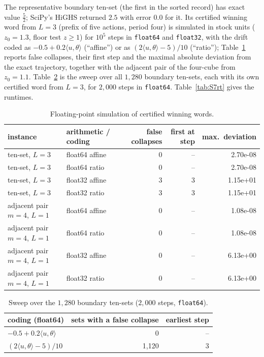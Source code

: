 \documentclass[11pt,a4paper]{article}
\theoremstyle{plain}
\theoremstyle{definition}
\theoremstyle{remark}
\newcommand{\tfr}[2]{\tfrac{#1}{#2}}
\begin{document}
The representative boundary ten-set (the first in the sorted record) has exact value $\tfr52$; SciPy's HiGHS returned $2.5$ with error $0.0$ for it. Its certified winning word from $L=3$ (prefix of five actions, period four) is simulated in stock units ($z_0=1.3$, floor test $z\ge1$) for $10^5$ steps in \texttt{float64} and \texttt{float32}, with the drift coded as $-0.5+0.2\langle u,\theta\rangle$ (``affine'') or as $(2\langle u,\theta\rangle-5)/10$ (``ratio''); Table~\ref{tab:S7sim} reports false collapses, their first step and the maximal absolute deviation from the exact trajectory, together with the adjacent pair of the four-cube from $z_0=1.1$. Table~\ref{tab:S7sweep} is the sweep over all $1{,}280$ boundary ten-sets, each with its own certified word from $L=3$, for $2{,}000$ steps in \texttt{float64}. Table~\ref{tab:S7rt} gives the runtimes.
\begin{table}[H]\centering\small
\caption{Floating-point simulation of certified winning words.}\label{tab:S7sim}
\begin{tabular}{llrrr}
\toprule
instance & arithmetic / coding & false collapses & first at step & max.\ deviation\\
\midrule
ten-set, $L=3$ & float64 affine & 0 & -- & 2.70e-08\\
ten-set, $L=3$ & float64 ratio & 0 & -- & 2.70e-08\\
ten-set, $L=3$ & float32 affine & 3 & 3 & 1.15e+01\\
ten-set, $L=3$ & float32 ratio & 3 & 3 & 1.15e+01\\
adjacent pair $m=4$, $L=1$ & float64 affine & 0 & -- & 1.08e-08\\
adjacent pair $m=4$, $L=1$ & float64 ratio & 0 & -- & 1.08e-08\\
adjacent pair $m=4$, $L=1$ & float32 affine & 0 & -- & 6.13e+00\\
adjacent pair $m=4$, $L=1$ & float32 ratio & 0 & -- & 6.13e+00\\
\bottomrule
\end{tabular}
\end{table}
\begin{table}[H]\centering\small
\caption{Sweep over the $1{,}280$ boundary ten-sets ($2{,}000$ steps, \texttt{float64}).}\label{tab:S7sweep}
\begin{tabular}{lrr}
\toprule
coding (float64) & sets with a false collapse & earliest step\\
\midrule
$-0.5+0.2\langle u,\theta\rangle$ & 0 & --\\
$(2\langle u,\theta\rangle-5)/10$ & 1{,}120 & 3\\
\bottomrule
\end{tabular}
\end{table}
\end{document}
